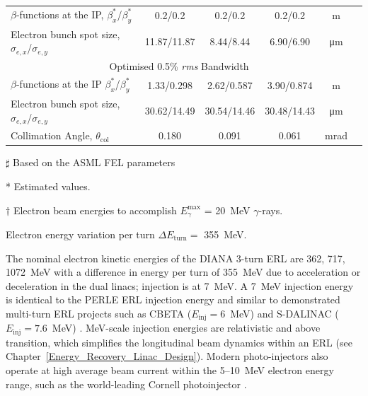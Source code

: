 \documentclass[../main.tex]{subfiles}
\begin{document}
\begin{table}[!h]
\begin{threeparttable}
{\begin{tabular}{lccccc}
\hline
$\beta$-functions at the IP, $\beta_{x}^{*}$/$\beta_{y}^{*}$ & 0.2/0.2 & 0.2/0.2 & 0.2/0.2 & \si{\meter} \\
Electron bunch spot size, $\sigma_{e,x}$/$\sigma_{e,y}$ & 11.87/11.87 & 8.44/8.44 & 6.90/6.90 & \si{\micro\meter}\\
\hline\multicolumn{5}{c}{Optimised 0.5\% \textit{rms} Bandwidth} \\
\hline
$\beta$-functions at the IP $\beta_{x}^{*}$/$\beta_{y}^{*}$ & 1.33/0.298 & 2.62/0.587 & 3.90/0.874 & \si{\meter} \\
Electron bunch spot size, $\sigma_{e,x}$/$\sigma_{e,y}$ & 30.62/14.49 & 30.54/14.46 & 30.48/14.43 & \si{\micro\meter}\\
Collimation Angle, $\theta_{\mathrm{col}}$ & 0.180 & 0.091 & 0.061 & \si{\milli\radian} \\ 
\hline\hline
\end{tabular}}
\begin{tablenotes}
\item[$\sharp$]{Based on the ASML FEL parameters \cite{akkermans2017compact}}
\item[*]{Estimated values.}
\item[$\dagger$]{Electron beam energies to accomplish $E_{\gamma}^{\mathrm{max}}$ = 20~\si{\mega\electronvolt} $\gamma$-rays.}
\item{Electron energy variation per turn $\Delta E_{\mathrm{turn}} =$ 355~\si{\mega\electronvolt}.}
\end{tablenotes}
\end{threeparttable}
\label{tab:DIANA_electron_beam_design_parameters}
\end{table}

The nominal electron kinetic energies of the DIANA 3-turn ERL are 362, 717, 1072~\si{\mega\electronvolt} with a difference in energy per turn of 355~\si{\mega\electronvolt} due to acceleration or deceleration in the dual linacs; injection is at 7~\si{\mega\electronvolt}. A 7~\si{\mega\electronvolt} injection energy is identical to the PERLE \cite{angal2018perle} ERL injection energy and similar to demonstrated multi-turn ERL projects such as CBETA ($E_{\mathrm{inj}}=6$~\si{\mega\electronvolt}) \cite{bartnik2020cbeta} and S-DALINAC ($E_{\mathrm{inj}}=7.6$~\si{\mega\electronvolt}) \cite{arnold2018first}. \si{\mega\electronvolt}-scale injection energies are relativistic and above transition, which simplifies the longitudinal beam dynamics within an ERL (see Chapter~\ref{Energy_Recovery_Linac_Design}). Modern photo-injectors also operate at high average beam current within the 5--10~\si{\mega\electronvolt} electron energy range, such as the world-leading Cornell photoinjector \cite{bartnik2015operational}. 
\end{document}

